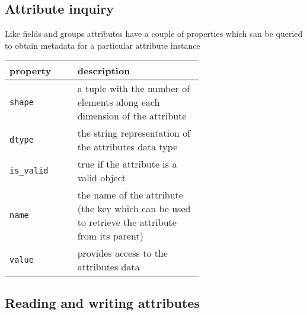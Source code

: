 \subsection{Attribute inquiry}

Like fields and groups attributes have a couple of properties which can be
queried to obtain metadata for a particular attribute instance
\begin{center}
    \begin{tabular}{l|p{0.65\linewidth}}
        property & description\\
        \hline\hline
        {\tt shape} & a tuple with the number of elements along each dimension
        of the attribute \\
        \hline
        {\tt dtype} & the string representation of the attributes data type  \\
        \hline
        {\tt is\_valid} & true if the attribute is a valid object \\
        \hline
        {\tt name} & the name of the attribute (the key which can be used 
        to retrieve the attribute from its parent) \\
        \hline
        {\tt value} & provides access to the attributes data \\
        \hline
    \end{tabular}
\end{center}

\subsection{Reading and writing attributes}


